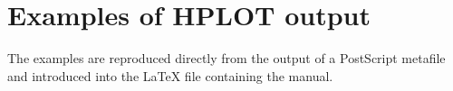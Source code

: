 \chapter{Examples of HPLOT output}
The examples are reproduced directly from the output of a PostScript metafile
and introduced into the \LaTeX{} file containing the \HPLOT{} manual.

